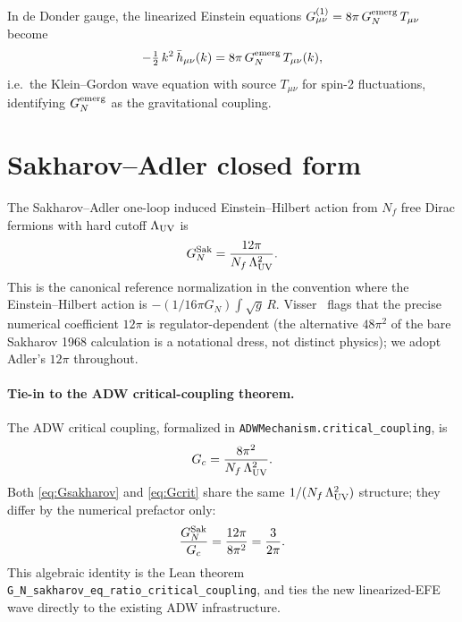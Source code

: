 \documentclass[aps,prd,twocolumn,showpacs,superscriptaddress,nofootinbib]{revtex4-2}
\newcommand{\GN}{G_{N}}
\newcommand{\GNemerg}{G_{N}^{\rm emerg}}
\newcommand{\GNsak}{G_{N}^{\rm Sak}}
\newcommand{\Lambdauv}{\Lambda_{\rm UV}}
\newcommand{\Nf}{N_{f}}
\newcommand{\Gc}{G_{c}}
\begin{document}
In de Donder gauge, the linearized Einstein equations
$G^{(1)}_{\mu\nu} = 8\pi\,\GNemerg\,T_{\mu\nu}$ become
\begin{equation}
\label{eq:gw-eom}
-\tfrac{1}{2}\,k^{2}\,\bar{h}_{\mu\nu}(k) = 8\pi\,\GNemerg\,T_{\mu\nu}(k),
\end{equation}
i.e.\ the Klein--Gordon wave equation with source $T_{\mu\nu}$ for
spin-2 fluctuations, identifying $\GNemerg$ as the gravitational
coupling.

\section{Sakharov--Adler closed form}
\label{sec:sakharov-adler}

The Sakharov--Adler one-loop induced Einstein--Hilbert action from
$\Nf$ free Dirac fermions with hard cutoff $\Lambdauv$
is~\cite{Sakharov1968,Adler1982,Visser2002}
\begin{equation}
\label{eq:Gsakharov}
\GNsak = \frac{12\pi}{\Nf\,\Lambdauv^{2}}.
\end{equation}
This is the canonical reference normalization in the convention
where the Einstein--Hilbert action is $-(1/16\pi\GN)\int\sqrt{g}\,R$.
Visser~\cite{Visser2002} flags that the precise numerical coefficient
$12\pi$ is regulator-dependent (the alternative $48\pi^{2}$
of the bare Sakharov 1968 calculation is a notational dress, not
distinct physics); we adopt Adler's $12\pi$ throughout.

\paragraph*{Tie-in to the ADW critical-coupling theorem.}
The ADW critical coupling, formalized in
\texttt{ADWMechanism.critical\_coupling}, is
\begin{equation}
\label{eq:Gcrit}
\Gc = \frac{8\pi^{2}}{\Nf\,\Lambdauv^{2}}.
\end{equation}
Both \eqref{eq:Gsakharov} and \eqref{eq:Gcrit} share the same
$1/(\Nf\,\Lambdauv^{2})$ structure; they differ by the numerical
prefactor only:
\begin{equation}
\label{eq:Gsak-Gc-ratio}
\frac{\GNsak}{\Gc} = \frac{12\pi}{8\pi^{2}} = \frac{3}{2\pi}.
\end{equation}
This algebraic identity is the Lean theorem
\texttt{G\_N\_sakharov\_eq\_ratio\_critical\_coupling}, and ties the
new linearized-EFE wave directly to the existing ADW infrastructure.
\end{document}
